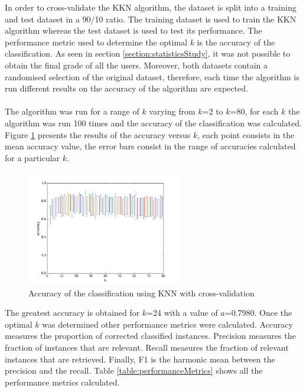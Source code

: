 \documentclass[11pt, oneside]{article}   	%
\begin{document}
In order to cross-validate the KKN algorithm, the dataset is split into a training and test dataset in a 90/10 ratio. The training dataset is used to train the KKN algorithm whereas the test dataset is used to test its performance. %
The performance metric used to determine the optimal $k$ is the accuracy of the classification. As seen in section \ref{section:statisticsStudy}, it was not possible to obtain the final grade of all the users. Moreover, both datasets contain a randomised selection of the original dataset, therefore, each time the algorithm is run different results on the accuracy of the algorithm are expected.\\\\
The algorithm was run for a range of $k$ varying from $k$=2 to $k$=80, for each $k$ the algorithm was run 100 times and the accuracy of the classification was calculated. Figure \ref{figure:knnFigure} presents the results of the accuracy versus $k$, each point consists in the mean accuracy value, the error bars consist in the range of accuracies calculated for a particular $k$.
\begin{figure}
        \centering
        \includegraphics[width=0.6\textwidth]{./pythonScripts/kNeighbours.png}
        \caption{Accuracy of the classification using KNN with cross-validation}
	\label{figure:knnFigure}
\end{figure}
The greatest accuracy is obtained for $k$=24 with a value of $a$=0.7980. Once the optimal $k$ was determined other performance metrics were calculated. Accuracy measures the proportion of corrected classified instances. Precision measures the fraction of instances that are relevant. Recall measures the fraction of relevant instances that are retrieved. Finally, F1 is the harmonic mean between the precision and the recall. Table \ref{table:performanceMetrics} shows all the performance metrics calculated.
\end{document}
